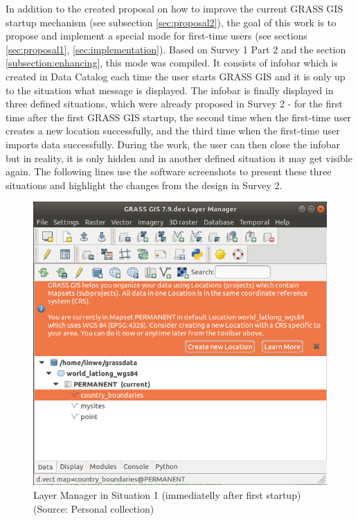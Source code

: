 \documentclass[a4paper,10pt,twoside]{article}
\begin{document}
\noindent In addition to the created proposal on how to improve the
current GRASS GIS startup mechanism (see subsection
\ref{sec:proposal2}), the goal of this work is to propose and
implement a special mode for first-time users (see sections
\ref{sec:proposal1}, \ref{sec:implementation}). Based on Survey 1 Part 2 
and the section \ref{subsection:enhancing},
this mode was compiled. It consists of infobar which is created in
Data Catalog each time the user starts GRASS GIS and it is only up to
the situation what message is displayed. The infobar is finally
displayed in three defined situations, which were already proposed in
Survey 2 - for the first time after the first GRASS GIS startup, the
second time when the first-time user creates a new location
successfully, and the third time when the first-time user imports data
successfully. During the work, the user can then close the infobar
but in reality, it is only hidden and in another defined situation it
may get visible again. The following lines use the software
screenshots to present these three situations and highlight the
changes from the design in Survey 2.

\vspace{0.3cm}
\begin{figure}[hbt!] 
\begin{center}
\includegraphics[width=12cm]{../pictures/lmgr1.png} 
\caption[Layer Manager in Situation 1 (immediatelly after first startup)]{Layer Manager in Situation 1 (immediatelly after first startup) (Source: Personal collection)}
\label{fig:lmgr1}
\end{center}
\end{figure}
\end{document}
